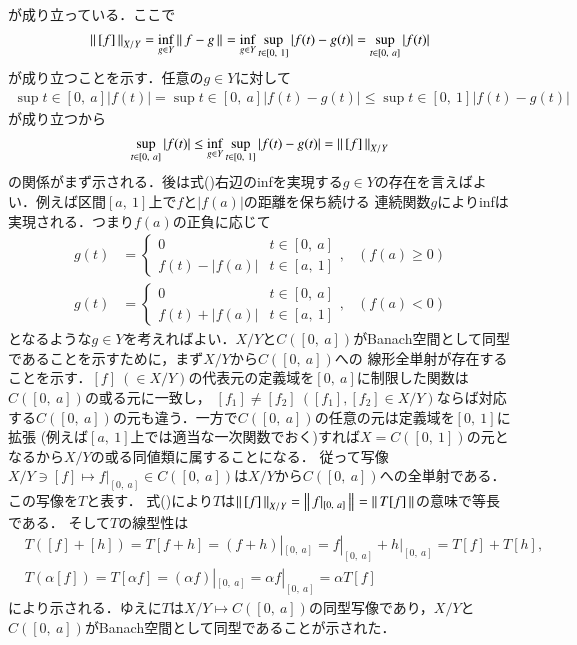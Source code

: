 \begin{prf}
\begin{description}
\begin{align}
		\end{align}
		が成り立っている．ここで
		\begin{align}
			\left\|\, [f]\, \right\|_{X/Y} = \operatorname*{inf}_{g \in Y} \left\|\, f - g\, \right\|_{} = \operatorname*{inf}_{g \in Y} \operatorname*{sup}_{t \in [0,\ 1]} |f(t) - g(t)| = \operatorname*{sup}_{t \in [0,\ a]} |f(t)| \label{eq:func_analy_Q5_1}
		\end{align}
		が成り立つことを示す．任意の$g \in Y$に対して
		\begin{align}
			\sup{t \in [0,\ a]}{|f(t)|} = \sup{t \in [0,\ a]}{|f(t) - g(t)|} \leq \sup{t \in [0,\ 1]}{|f(t) - g(t)|}
		\end{align}
		が成り立つから
		\begin{align}
			\operatorname*{sup}_{t \in [0,\ a]} |f(t)| \leq \operatorname*{inf}_{g \in Y} \operatorname*{sup}_{t \in [0,\ 1]} |f(t) - g(t)| = \left\|\, [f]\, \right\|_{X/Y} \label{eq:func_analy_Q5_2}
		\end{align}
		の関係がまず示される．後は式()右辺のinfを実現する$g \in Y$の存在を言えばよい．例えば区間$[a,\ 1]$上で$f$と$|f(a)|$の距離を保ち続ける
		連続関数$g$によりinfは実現される．つまり$f(a)$の正負に応じて
		\begin{align}
			g(t) &= \begin{cases}
				0 & t \in [0,\ a] \\
				f(t) - |f(a)| & t \in [a,\ 1]
			\end{cases}, & (f(a) \geq 0) \\ 
			g(t) &= \begin{cases}
				0 & t \in [0,\ a] \\
				f(t) + |f(a)| & t \in [a,\ 1]
			\end{cases}, & (f(a) < 0)
		\end{align}
		となるような$g \in Y$を考えればよい．$X/Y$と$C([0,\ a])$がBanach空間として同型であることを示すために，まず$X/Y$から$C([0,\ a])$への
		線形全単射が存在することを示す．$[f]\ (\in X/Y)$の代表元の定義域を$[0,\ a]$に制限した関数は$C([0,\ a])$の或る元に一致し，
		$[f_1] \neq [f_2]\ ([f_1],[f_2] \in X/Y)$ならば対応する$C([0,\ a])$の元も違う．一方で$C([0,\ a])$の任意の元は定義域を$[0,\ 1]$に拡張
		(例えば$[a,\ 1]$上では適当な一次関数でおく)すれば$X=C([0,\ 1])$の元となるから$X/Y$の或る同値類に属することになる．
		従って写像$X/Y \ni [f] \longmapsto f|_{[0,\ a]} \in C([0,\ a])$は$X/Y$から$C([0,\ a])$への全単射である．この写像を$T$と表す．
		式()により$T$は$\left\|\, [f]\, \right\|_{X/Y} = \left\|\, f|_{[0,\ a]}\, \right\|_{} = \left\|\, T[f]\, \right\|_{}$の意味で等長である．
		そして$T$の線型性は
		\begin{align}
			&T([f] + [h]) = T[f+h] = (f+h)|_{[0,\ a]} = f|_{[0,\ a]} + h|_{[0,\ a]} = T[f] + T[h], \\
			&T(\alpha[f]) = T[\alpha f] = (\alpha f)|_{[0,\ a]} = \alpha f|_{[0,\ a]} = \alpha T[f]
		\end{align}
		により示される．ゆえに$T$は$X/Y \longmapsto C([0,\ a])$の同型写像であり，$X/Y$と$C([0,\ a])$がBanach空間として同型であることが示された．
		\QED
\end{description}
\end{prf}

